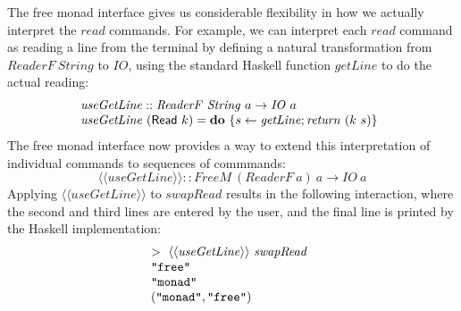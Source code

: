 \documentclass{jfp1}
\newcommand{\fmext}[1]{\langle\langle #1 \rangle\rangle}
\newcommand{\kw}[1]{\textbf{#1}}
\begin{document}
The free monad interface gives us considerable flexibility in how we
actually interpret the $\mathit{read}$ commands. For example, we can
interpret each $\mathit{read}$ command as reading a line from the
terminal by defining a natural transformation from
$\mathit{ReaderF}~\mathit{String}$ to $\mathit{IO}$, using the
standard Haskell function $\mathit{getLine}$ to do the actual reading:
\begin{displaymath}
  \begin{array}{@{}l}
    \mathit{useGetLine} :: \mathit{ReaderF}~\mathit{String}~a \to \mathit{IO}~a \\
    \mathit{useGetLine}~(\mathsf{Read}~k) = \kw{do}~\{ s \leftarrow \mathit{getLine}; \mathit{return}~(k~s) \}
  \end{array}
\end{displaymath}
The free monad interface now provides a way to extend this
interpretation of individual commands to sequences of commmands:
\begin{displaymath}
  \fmext{\mathit{useGetLine}} :: \mathit{FreeM}~(\mathit{ReaderF}~a)~a \to \mathit{IO}~a
\end{displaymath}
Applying $\fmext{\mathit{useGetLine}}$ to $\mathit{swapRead}$ results
in the following interaction, where the second and third lines are
entered by the user, and the final line is printed by the Haskell
implementation:
\begin{displaymath}
  \begin{array}{@{}l}
    >~\fmext{\mathit{useGetLine}}~\mathit{swapRead} \\
    \texttt{"free"} \\
    \texttt{"monad"} \\
    (\texttt{"monad"}, \texttt{"free"})
  \end{array}
\end{displaymath}
\end{document}
